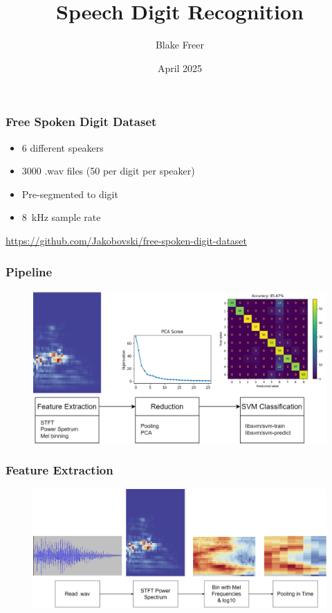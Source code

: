 \documentclass{beamer}
\title{Speech Digit Recognition}
\author{Blake Freer}
\date{April 2025}
\begin{document}
\frame{\titlepage}

\begin{frame}
  \frametitle{Free Spoken Digit Dataset}
  \vfill
  \begin{itemize}
    \item 6 different speakers
    \item 3000 .wav files (50 per digit per speaker)
    \item Pre-segmented to digit
    \item \qty{8}{\kilo\hertz} sample rate
  \end{itemize}
  \vfill
  \tiny\url{https://github.com/Jakobovski/free-spoken-digit-dataset}
\end{frame}

\begin{frame}
  \frametitle{Pipeline}
  \begin{figure}[h]
    \centering
    \includegraphics[width=\textwidth]{img/pipeline-pipeline.png}
  \end{figure}
\end{frame}

\begin{frame}
  \frametitle{Feature Extraction}
  \begin{figure}[h]
    \centering
    \includegraphics[width=\textwidth]{img/pipeline-feature.png}
  \end{figure}
\end{frame}
\end{document}
